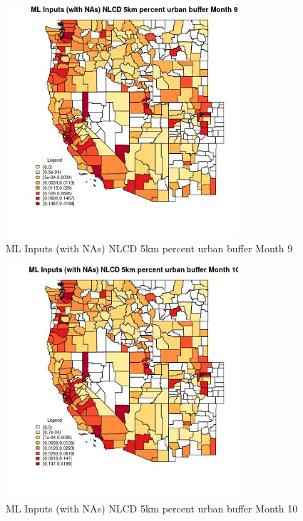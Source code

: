 \begin{figure} 
\centering  
\includegraphics[width=0.77\textwidth]{Code_Outputs/Report_ML_input_PM25_Step4_part_e_de_duplicated_aves_compiled_2019-05-21wNAs_CountyNLCD_5km_percent_urban_buffermedianMonth9.jpg} 
\caption{\label{fig:Report_ML_input_PM25_Step4_part_e_de_duplicated_aves_compiled_2019-05-21wNAsCountyNLCD_5km_percent_urban_buffermedianMonth9}ML Inputs (with NAs) NLCD 5km percent urban buffer Month 9} 
\end{figure} 
 

\begin{figure} 
\centering  
\includegraphics[width=0.77\textwidth]{Code_Outputs/Report_ML_input_PM25_Step4_part_e_de_duplicated_aves_compiled_2019-05-21wNAs_CountyNLCD_5km_percent_urban_buffermedianMonth10.jpg} 
\caption{\label{fig:Report_ML_input_PM25_Step4_part_e_de_duplicated_aves_compiled_2019-05-21wNAsCountyNLCD_5km_percent_urban_buffermedianMonth10}ML Inputs (with NAs) NLCD 5km percent urban buffer Month 10} 
\end{figure} 
 

